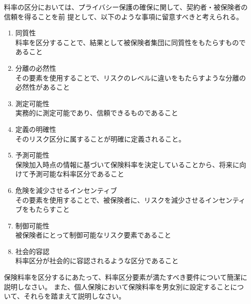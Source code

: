 \documentclass[report,gutter=10mm,fore-edge=10mm,uplatex,dvipdfmx]{jlreq}
\begin{document}
料率の区分においては、プライバシー保護の確保に関して、契約者・被保険者の信頼を得ることを前
提として、以下のような事項に留意すべきと考えられる。

\begin{enumerate}
\tightlist
\item
  同質性\\
  料率を区分することで、結果として被保険者集団に同質性をもたらすものであること
\item
  分離の必然性\\
  その要素を使用することで、リスクのレベルに違いをもたらすような分離の必然性があること
\item
  測定可能性\\ 実務的に測定可能であり、信頼できるものであること
\item
  定義の明確性\\ そのリスク区分に属することが明確に定義されること。
\item
  予測可能性\\
  保険加入時点の情報に基づいて保険料率を決定していることから、将来に向けて予測可能な料率区分であること
\item
  危険を減少させるインセンティブ\\
  その要素を使用することで、被保険者に、リスクを減少させるインセンティブをもたらすこと
\item
  制御可能性\\ 被保険者にとって制御可能なリスク要素であること
\item
  社会的容認\\ 料率区分が社会的に容認されるような区分であること
\end{enumerate}



保険料率を区分するにあたって、料率区分要素が満たすべき要件について簡潔に説明しなさい。
また、個人保険において保険料率を男女別に設定することについて、それらを踏まえて説明しなさい。

\end{document}
